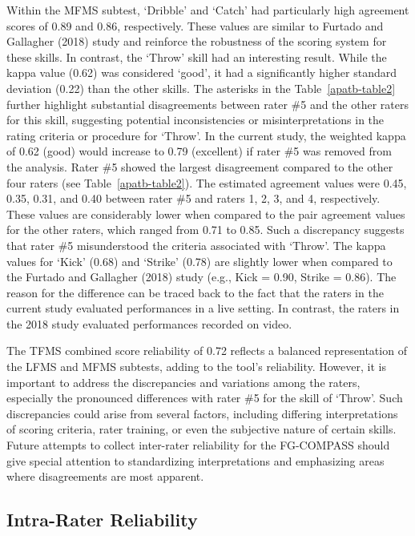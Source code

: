 \documentclass[
  man,
  colorlinks=true,linkcolor=blue,citecolor=blue,urlcolor=blue]{apa7}
\begin{document}
Within the MFMS subtest, `Dribble' and `Catch' had particularly high
agreement scores of 0.89 and 0.86, respectively. These values are
similar to Furtado and Gallagher (2018) study and reinforce the
robustness of the scoring system for these skills. In contrast, the
`Throw' skill had an interesting result. While the kappa value (0.62)
was considered `good', it had a significantly higher standard deviation
(0.22) than the other skills. The asterisks in the
Table~\ref{apatb-table2} further highlight substantial disagreements
between rater \#5 and the other raters for this skill, suggesting
potential inconsistencies or misinterpretations in the rating criteria
or procedure for `Throw'. In the current study, the weighted kappa of
0.62 (good) would increase to 0.79 (excellent) if rater \#5 was removed
from the analysis. Rater \#5 showed the largest disagreement compared to
the other four raters (see Table~\ref{apatb-table2}). The estimated
agreement values were 0.45, 0.35, 0.31, and 0.40 between rater \#5 and
raters 1, 2, 3, and 4, respectively. These values are considerably lower
when compared to the pair agreement values for the other raters, which
ranged from 0.71 to 0.85. Such a discrepancy suggests that rater \#5
misunderstood the criteria associated with `Throw'. The kappa values for
`Kick' (0.68) and `Strike' (0.78) are slightly lower when compared to
the Furtado and Gallagher (2018) study (e.g., Kick = 0.90, Strike =
0.86). The reason for the difference can be traced back to the fact that
the raters in the current study evaluated performances in a live
setting. In contrast, the raters in the 2018 study evaluated
performances recorded on video.

The TFMS combined score reliability of 0.72 reflects a balanced
representation of the LFMS and MFMS subtests, adding to the tool's
reliability. However, it is important to address the discrepancies and
variations among the raters, especially the pronounced differences with
rater \#5 for the skill of `Throw'. Such discrepancies could arise from
several factors, including differing interpretations of scoring
criteria, rater training, or even the subjective nature of certain
skills. Future attempts to collect inter-rater reliability for the
FG-COMPASS should give special attention to standardizing
interpretations and emphasizing areas where disagreements are most
apparent.

\hypertarget{intra-rater-reliability}{%
\subsection{Intra-Rater Reliability}\label{intra-rater-reliability}}
\end{document}
